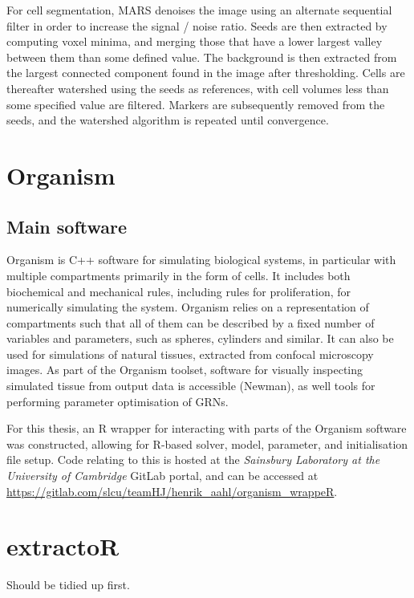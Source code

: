 For cell segmentation, MARS denoises the image using an alternate sequential filter in
order to increase the signal / noise ratio. Seeds are then extracted by
computing voxel minima, and merging those that have a lower largest valley
between them than some defined value. The background is then extracted from the
largest connected component found in the image after thresholding. Cells are
thereafter watershed using the seeds as references, with cell volumes less than
some specified value are filtered. Markers are subsequently removed from the
seeds, and the watershed algorithm is repeated until convergence. \CITE

\section{Organism}
\subsection{Main software}
Organism is C++ software for simulating biological systems, in particular with
multiple compartments primarily in the form of cells. It includes both
biochemical and mechanical rules, including rules for proliferation, for
numerically simulating the system. Organism relies on a representation of
compartments such that all of them can be described by a fixed number of
variables and parameters, such as spheres, cylinders and similar. It can also be
used for simulations of natural tissues, extracted from confocal microscopy
images. As part of the Organism toolset, software for visually inspecting
simulated tissue from output data is accessible (Newman), as well tools for
performing parameter optimisation of GRNs. \CITE

For this thesis, an R wrapper for interacting with parts of the Organism software was
constructed, allowing for R-based solver, model, parameter, and initialisation file setup.
Code relating to this is hosted at the \textit{Sainsbury Laboratory at the University of
  Cambridge} GitLab portal, and can be accessed at 
\url{https://gitlab.com/slcu/teamHJ/henrik_aahl/organism_wrappeR}.

\section{extractoR}
Should be tidied up first.

